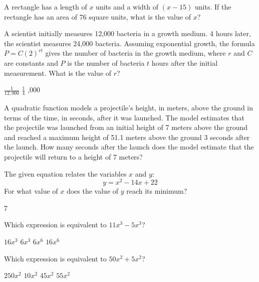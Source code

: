 \newpage



\question[1]
A rectangle has a length of $x$ units and a width of $(x-15)$ units. If the rectangle has an area of 76 square units, what is the value of $x$?
\begin{choices}
\end{choices}

\question[1]
A scientist initially measures 12,000 bacteria in a growth medium. 4 hours later, the scientist measures 24,000 bacteria. Assuming exponential growth, the formula $P=C(2)^{rt}$ gives the number of bacteria in the growth medium, where $r$ and $C$ are constants and $P$ is the number of bacteria $t$ hours after the initial measurement. What is the value of $r$?
\begin{choices}
  \choice $\frac{1}{12,000}$
  \CorrectChoice $\frac{1}{4}$
  ,000
\end{choices}

\question[1]
A quadratic function models a projectile's height, in meters, above the ground in terms of the time, in seconds, after it was launched. The model estimates that the projectile was launched from an initial height of 7 meters above the ground and reached a maximum height of 51.1 meters above the ground 3 seconds after the launch. How many seconds after the launch does the model estimate that the projectile will return to a height of 7 meters?
\begin{choices}
\end{choices}



\newpage



\question[1]
The given equation relates the variables $x$ and $y$:
\[
  y=x^{2}-14x+22
\]
For what value of $x$ does the value of $y$ reach its minimum?
\begin{solution}
7
\end{solution}

\question[1]
Which expression is equivalent to $11x^{3}-5x^{3}$?
\begin{choices}
  \choice $16x^{3}$
  \CorrectChoice $6x^{3}$
  \choice $6x^{6}$
  \choice $16x^{6}$
\end{choices}

\question[1]
Which expression is equivalent to $50x^{2}+5x^{2}$?
\begin{choices}
  \choice $250x^{2}$
  \choice $10x^{2}$
  \choice $45x^{2}$
  \CorrectChoice $55x^{2}$
\end{choices}

